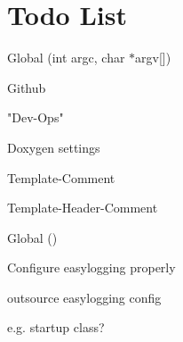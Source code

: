 \chapter{Todo List}
\hypertarget{todo}{}\label{todo}

\begin{DoxyRefList}
\item[Global \doxylink{main_8cpp_a0ddf1224851353fc92bfbff6f499fa97}{main} (int argc, char \texorpdfstring{$\ast$}{*}argv\mbox{[}\mbox{]})]\label{todo__todo000001}%
%

\begin{DoxyItemize}
\item Github
\item "{}\+Dev-\/\+Ops"{}
\item Doxygen settings
\item Template-\/\+Comment
\item Template-\/\+Header-\/\+Comment  
\end{DoxyItemize}
\item[Global \doxylink{namespaceWIP_a8abade321630427e408845cf8b194c56}{WIP\+::example\+Easy\+Logging} ()]\label{todo__todo000002}%
%

\begin{DoxyItemize}
\item Configure easylogging properly
\item outsource easylogging config
\begin{DoxyItemize}
\item e.\+g. startup class? 
\end{DoxyItemize}
\end{DoxyItemize}
\end{DoxyRefList}